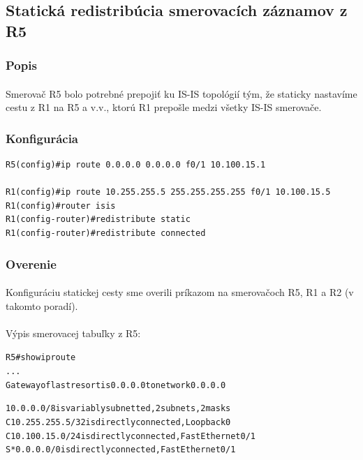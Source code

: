 \documentclass[12pt,twoside,a4paper]{report}
\begin{document}
\subsection{Statická redistribúcia smerovacích záznamov z R5}
\subsubsection{Popis}
\paragraph{}
Smerovač R5 bolo potrebné prepojiť ku IS-IS topológií tým, že staticky nastavíme cestu z R1 na R5 a v.v., ktorú R1 prepošle medzi všetky IS-IS smerovače.

\subsubsection{Konfigurácia}
\noindent
{\selectfont
\begin{small}
\begin{verbatim}
R5(config)#ip route 0.0.0.0 0.0.0.0 f0/1 10.100.15.1

R1(config)#ip route 10.255.255.5 255.255.255.255 f0/1 10.100.15.5
R1(config)#router isis
R1(config-router)#redistribute static
R1(config-router)#redistribute connected
\end{verbatim}
\end{small}
}

\subsubsection{Overenie}
\paragraph{}
Konfiguráciu statickej cesty sme overili príkazom  na smerovačoch R5, R1 a R2 (v takomto poradí).

\paragraph{}
Výpis smerovacej tabuľky z R5:

\noindent
{\selectfont
\begin{small}
\begin{alltt}
R5#show ip route
...
Gateway of last resort is 0.0.0.0 to network 0.0.0.0

     10.0.0.0/8 is variably subnetted, 2 subnets, 2 masks
C       10.255.255.5/32 is directly connected, Loopback0
C       10.100.15.0/24 is directly connected, FastEthernet0/1
S*   0.0.0.0/0 is directly connected, FastEthernet0/1
\end{alltt}
\end{small}
}
\end{document}
